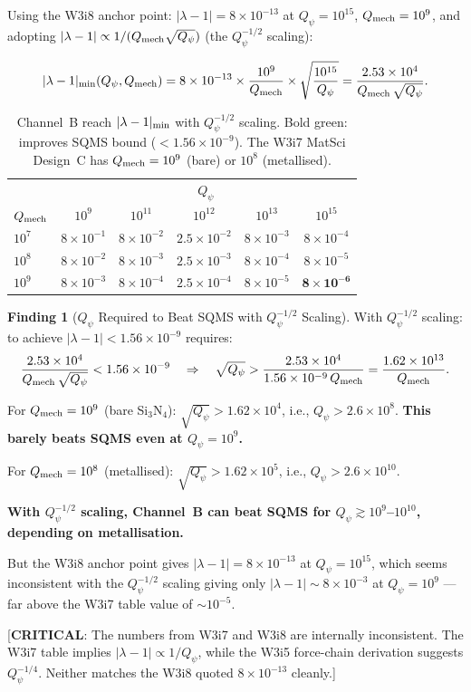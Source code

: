\documentclass[11pt]{article}
\newcommand{\lam}{\lambda}
\newcommand{\ee}[1]{\times 10^{#1}}
\newcommand{\Qpsi}{Q_\psi}
\newcommand{\Qmech}{Q_{\rm mech}}
\newcommand{\lbone}{|\lam - 1|}
\theoremstyle{definition}
\newtheorem{finding}[theorem]{Finding}
\theoremstyle{remark}
\begin{document}
Using the W3i8 anchor point: $\lbone = 8\ee{-13}$ at
$\Qpsi = 10^{15}$, $\Qmech = 10^{9}$, and adopting
$\lbone \propto 1/(\Qmech\sqrt{\Qpsi})$ (the $\Qpsi^{-1/2}$ scaling):

\begin{equation}
\lbone_{\rm min}(\Qpsi, \Qmech) = 8\ee{-13}\times
\frac{10^9}{\Qmech}\times\sqrt{\frac{10^{15}}{\Qpsi}}
= \frac{2.53\ee{4}}{\Qmech\,\sqrt{\Qpsi}}.
\label{eq:parametric_half}
\end{equation}

\begin{table}[H]
\centering
\caption{Channel~B reach $\lbone_{\rm min}$ with $\Qpsi^{-1/2}$ scaling.
Bold green: improves SQMS bound ($< 1.56\ee{-9}$).
The W3i7 MatSci Design~C has $\Qmech = 10^9$ (bare) or $10^8$
(metallised).}
\label{tab:parametric_half}
\renewcommand{\arraystretch}{1.3}
\begin{tabular}{@{}l|ccccc@{}}
\toprule
& \multicolumn{5}{c}{\textbf{$\Qpsi$}} \\
\textbf{$\Qmech$} & $10^{9}$ & $10^{11}$ & $10^{12}$ & $10^{13}$ & $10^{15}$ \\
\midrule
$10^{7}$ &
  $8\ee{-1}$ & $8\ee{-2}$ & $2.5\ee{-2}$ & $8\ee{-3}$ & $8\ee{-4}$ \\
$10^{8}$ &
  $8\ee{-2}$ & $8\ee{-3}$ & $2.5\ee{-3}$ & $8\ee{-4}$ & $8\ee{-5}$ \\
$10^{9}$ &
  $8\ee{-3}$ & $8\ee{-4}$ & $2.5\ee{-4}$ & $8\ee{-5}$ & $\mathbf{8\ee{-6}}$ \\
\bottomrule
\end{tabular}
\end{table}

\begin{finding}[$\Qpsi$ Required to Beat SQMS with $\Qpsi^{-1/2}$ Scaling]
\label{find:Qpsi_required_half}
With $\Qpsi^{-1/2}$ scaling: to achieve $\lbone < 1.56\ee{-9}$
requires:
\begin{equation}
\frac{2.53\ee{4}}{\Qmech\,\sqrt{\Qpsi}} < 1.56\ee{-9}
\quad\Rightarrow\quad
\sqrt{\Qpsi} > \frac{2.53\ee{4}}{1.56\ee{-9}\,\Qmech}
= \frac{1.62\ee{13}}{\Qmech}.
\end{equation}

For $\Qmech = 10^9$ (bare Si$_3$N$_4$):
$\sqrt{\Qpsi} > 1.62\ee{4}$, i.e., $\Qpsi > 2.6\ee{8}$.
\textbf{This barely beats SQMS even at $\Qpsi = 10^{9}$.}

For $\Qmech = 10^8$ (metallised):
$\sqrt{\Qpsi} > 1.62\ee{5}$, i.e., $\Qpsi > 2.6\ee{10}$.

\textbf{With $\Qpsi^{-1/2}$ scaling, Channel~B can beat SQMS for
$\Qpsi \gtrsim 10^{9}$--$10^{10}$, depending on metallisation.}

But the W3i8 anchor point gives $\lbone = 8\ee{-13}$ at
$\Qpsi = 10^{15}$, which seems inconsistent with the $\Qpsi^{-1/2}$
scaling giving only $\lbone \sim 8\ee{-3}$ at $\Qpsi = 10^{9}$ ---
far above the W3i7 table value of $\sim 10^{-5}$.

[\textbf{CRITICAL}: The numbers from W3i7 and W3i8 are internally
inconsistent. The W3i7 table implies $\lbone \propto 1/\Qpsi$,
while the W3i5 force-chain derivation suggests $\Qpsi^{-1/4}$.
Neither matches the W3i8 quoted $8\ee{-13}$ cleanly.]
\end{finding}
\end{document}
